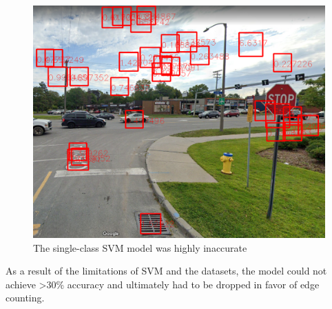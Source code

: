 \begin{figure}[H]
  \centering
  \includegraphics[scale=.3]{figures/badML.png}
  \caption{The single-class SVM model was highly inaccurate}
\end{figure}

As a result of the limitations of SVM and the datasets, the model could not achieve >30\% accuracy and ultimately had to be dropped in favor of edge counting.